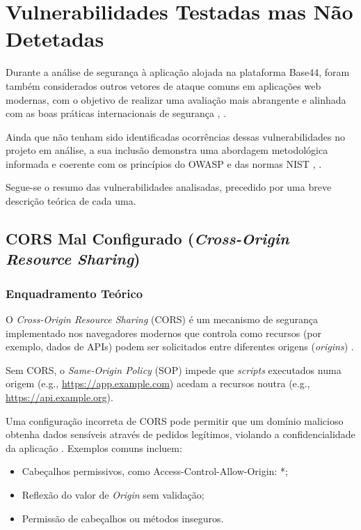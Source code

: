 \section{Vulnerabilidades Testadas mas Não Detetadas}

Durante a análise de segurança à aplicação alojada na plataforma Base44, foram também considerados outros vetores de ataque comuns em aplicações web modernas, com o objetivo de realizar uma avaliação mais abrangente e alinhada com as boas práticas internacionais de segurança \cite{ref1}, \cite{ref2}.

Ainda que não tenham sido identificadas ocorrências dessas vulnerabilidades no projeto em análise, a sua inclusão demonstra uma abordagem metodológica informada e coerente com os princípios do OWASP e das normas NIST \cite{ref3}, \cite{ref4}.

Segue-se o resumo das vulnerabilidades analisadas, precedido por uma breve descrição teórica de cada uma.

\subsection{CORS Mal Configurado (\textit{Cross-Origin Resource Sharing})}

\subsubsection{Enquadramento Teórico}

O \textit{Cross-Origin Resource Sharing} (CORS) é um mecanismo de segurança implementado nos navegadores modernos que controla como recursos (por exemplo, dados de APIs) podem ser solicitados entre diferentes origens (\textit{origins}) \cite{ref5}.

Sem CORS, o \textit{Same-Origin Policy} (SOP) impede que \textit{scripts} executados numa origem (e.g., \url{https://app.example.com}) acedam a recursos noutra (e.g., \url{https://api.example.org}).

Uma configuração incorreta de CORS pode permitir que um domínio malicioso obtenha dados sensíveis através de pedidos legítimos, violando a confidencialidade da aplicação \cite{ref6}. Exemplos comuns incluem:
\begin{itemize}

\item Cabeçalhos permissivos, como Access-Control-Allow-Origin: *;

\item Reflexão do valor de \textit{Origin} sem validação;

\item Permissão de cabeçalhos ou métodos inseguros.

\end{itemize}

